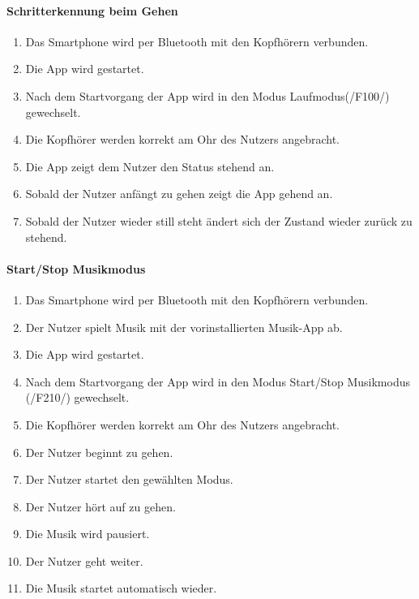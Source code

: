 \documentclass[a4paper,12pt]{article}
\begin{document}
  \paragraph{Schritterkennung beim Gehen}%
  \begin{enumerate}
    \item Das Smartphone wird per Bluetooth mit den Kopfhörern verbunden.
    \item Die App wird gestartet.
    \item Nach dem Startvorgang der App wird in den Modus \glqq Laufmodus\grqq{}(/F100/) gewechselt.
    \item Die Kopfhörer werden korrekt am Ohr des Nutzers angebracht.
    \item Die App zeigt dem Nutzer den Status \glqq stehend\grqq{} an.
    \item Sobald der Nutzer anfängt zu gehen zeigt die App \glqq gehend\grqq{} an.
    \item Sobald der Nutzer wieder still steht ändert sich der Zustand wieder zurück zu \glqq stehend\grqq. 
  \end{enumerate}

  \paragraph{Start/Stop Musikmodus}
  \begin{enumerate}
    \item Das Smartphone wird per Bluetooth mit den Kopfhörern verbunden.
    \item Der Nutzer spielt Musik mit der vorinstallierten Musik-App ab.
    \item Die App wird gestartet.
    \item Nach dem Startvorgang der App wird in den Modus \glqq Start/Stop Musikmodus\grqq{} (/F210/) gewechselt.
    \item Die Kopfhörer werden korrekt am Ohr des Nutzers angebracht.
    \item Der Nutzer beginnt zu gehen.
    \item Der Nutzer startet den gewählten Modus.
    \item Der Nutzer hört auf zu gehen.
    \item Die Musik wird pausiert.
    \item Der Nutzer geht weiter.
    \item Die Musik startet automatisch wieder.
  \end{enumerate}
\end{document}
